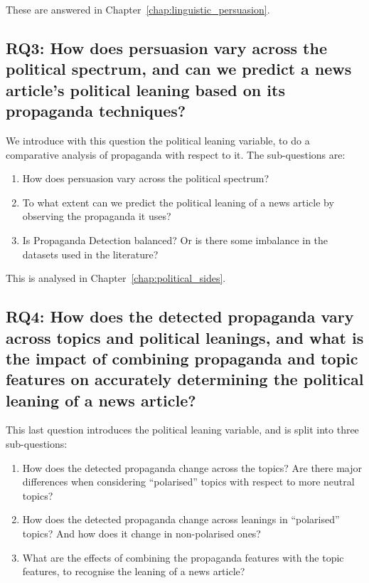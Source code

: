 These are answered in Chapter~\ref{chap:linguistic_persuasion}.

\subsection*{RQ3: How does persuasion vary across the political spectrum, and can we predict a news article's political leaning based on its propaganda techniques?}

We introduce with this question the political leaning variable, to do a comparative analysis of propaganda with respect to it. The sub-questions are:

\begin{enumerate}[label={\textbf{RQ3.\arabic*:}},leftmargin=2cm]
    \item How does persuasion vary across the political spectrum?
    \item To what extent can we predict the political leaning of a news article by observing the propaganda it uses?
    \item Is Propaganda Detection balanced? Or is there some imbalance in the datasets used in the literature?
\end{enumerate}

This is analysed in Chapter~\ref{chap:political_sides}.

\subsection*{RQ4: How does the detected propaganda vary across topics and political leanings, and what is the impact of combining propaganda and topic features on accurately determining the political leaning of a news article?}

This last question introduces the political leaning variable, and is split into three sub-questions:

\begin{enumerate}[label={\textbf{RQ4.\arabic*:}},leftmargin=2cm]
    \item How does the detected propaganda change across the topics? Are there major differences when considering “polarised” topics with respect to more neutral topics?
    \item How does the detected propaganda change across leanings in “polarised” topics? And how does it change in non-polarised ones?
    \item What are the effects of combining the propaganda features with the topic features, to recognise the leaning of a news article?
\end{enumerate}


